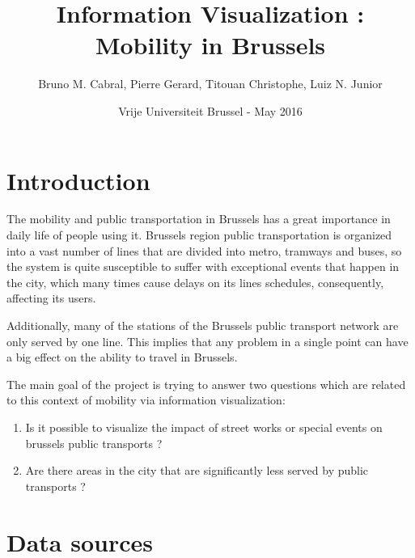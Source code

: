 \documentclass[11pt]{article}%
\begin{document}
\title{Information Visualization : Mobility in Brussels}
\author{Bruno M. Cabral, Pierre Gerard, Titouan Christophe, Luiz N. Junior}
\date{Vrije Universiteit Brussel - May 2016}
\maketitle


\section{Introduction}

The mobility and public transportation in Brussels has a great importance in daily life of people using it.  Brussels region public transportation is organized into a vast number of lines that are divided into metro, tramways and buses, so the system is quite susceptible to suffer with exceptional events that happen in the city, which many times cause delays on its lines schedules, consequently, affecting its users.

Additionally, many of the stations of the Brussels public transport network are only served by one line. This implies that any problem in a single point can have a big effect on the ability to travel in Brussels.

The main goal of the project is trying to answer two questions which are related to this context of mobility via information visualization:

\begin{enumerate}
	\item Is it possible to visualize the impact of street works or special events on brussels public transports ?
	\item Are there areas in the city that are significantly less served by public transports ?
\end{enumerate}


\section{Data sources}
\end{document}
